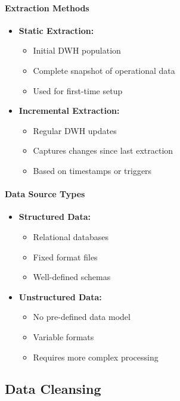 \documentclass[a4paper,11pt]{article}
\begin{document}
\paragraph{Extraction Methods}
\begin{itemize}
    \item \textbf{Static Extraction:}
        \begin{itemize}
            \item Initial DWH population
            \item Complete snapshot of operational data
            \item Used for first-time setup
        \end{itemize}
    \item \textbf{Incremental Extraction:}
        \begin{itemize}
            \item Regular DWH updates
            \item Captures changes since last extraction
            \item Based on timestamps or triggers
        \end{itemize}
\end{itemize}

\paragraph{Data Source Types}
\begin{itemize}
    \item \textbf{Structured Data:}
        \begin{itemize}
            \item Relational databases
            \item Fixed format files
            \item Well-defined schemas
        \end{itemize}
    \item \textbf{Unstructured Data:}
        \begin{itemize}
            \item No pre-defined data model
            \item Variable formats
            \item Requires more complex processing
        \end{itemize}
\end{itemize}

\subsection{Data Cleansing}
\end{document}
